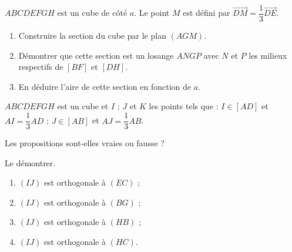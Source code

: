 \documentclass{cornouaille}
\begin{document}
\begin{colonne*exercice}
  \begin{exercice}
    $ABCDEFGH$ est un cube de côté $a$. Le point $M$ est défini par
    $\overrightarrow{DM}=\dfrac{1}{3}\overrightarrow{DE}$.
    \begin{enumerate}
    \item Construire la section du cube par le plan $(AGM)$.
    \item Démontrer que cette section est un losange $ANGP$ avec $N$
      et $P$ les milieux respectifs de $[BF]$ et $[DH]$.
    \item En déduire l'aire de cette section en fonction de $a$.
    \end{enumerate}
  \end{exercice}

  \begin{exercice}
    $ABCDEFGH$ est un cube et $I$ ; $J$ et $K$ les points tels que :
    $I\in [AD]$ et $AI=\dfrac{1}{3}AD$ ; $J\in [AB]$ et
    $AJ=\dfrac{1}{3}AB$.

    \begin{center}
      
    \end{center}

    Les propositions sont-elles vraies ou fausse ?

    Le démontrer.
    \begin{enumerate}
    \item $(IJ)$ est orthogonale à $(EC)$ ; \item $(IJ)$ est
      orthogonale à $(BG)$ ;
    \item $(IJ)$ est orthogonale à $(HB)$ ; \item $(IJ)$ est
      orthogonale à $(HC)$.
    \end{enumerate}
  \end{exercice}


\end{colonne*exercice}
\end{document}
